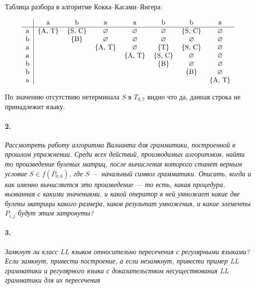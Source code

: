 \documentclass[russian]{article}
\begin{document}
Таблица разбора в алгоритме Кокка–Касами–Янгера:

\begin{align*}
\begin{tabular}{c | c c c c c c c}
	~ & a & b & a & a & b & b & a \\
	\hline
	a & \{A, T\} & \{S, C\} & $\varnothing$ & $\varnothing$ & $\varnothing$ & \{S, C\} & $\varnothing$  \\
	b & ~ & \{B\} & $\varnothing$ & $\varnothing$ & $\varnothing$ & $\varnothing$ & $\varnothing$  \\
	a & ~ & ~ & \{A, T\} & $\varnothing$ & \{T\} &  \{S, C\} & $\varnothing$ \\
	a & ~ & ~ & ~ & \{A, T\} &  \{S, C\} & $\varnothing$ & $\varnothing$  \\
	b & ~ & ~ & ~ & ~ & \{B\} & $\varnothing$ & $\varnothing$  \\
	b & ~ & ~ & ~ & ~ & ~ & \{B\} & $\varnothing$  \\
	a & ~ & ~ & ~ & ~ & ~ & ~ & \{A, T\}  \\
\end{tabular}
\end{align*}

По значению отсутствию нетерминала $S$ в $T_{0, 7}$ видно что да, данная строка не принадлежит языку.

\pagebreak

\paragraph*{2.}

\textit{Рассмотреть работу алгоритма Валианта для грамматики, построенной в прошлом упражнении. Среди всех действий, производимых алгоритмом, найти то произведение булевых матриц, после вычисления которого станет верным условие $S \in f(P_{0,6})$, где $S$ — начальный символ грамматики. Описать, когда и как именно вычисляется это произведение — то есть, какая процедура, вызванная с какими значениями, и какой оператор в ней умножает какие две булевы матрицы какого размера, каков результат умножения, и какие элементы $P_{i,j}$ будут этим затронуты?}

\paragraph*{3.}

\textit{Замкнут ли класс LL языков относительно пересечения с регулярными языками? Если замкнут, привести построение, а если незамкнут, привести пример LL грамматики и регулярного языка с доказательством несуществования LL грамматики для их пересечения}
\end{document}
